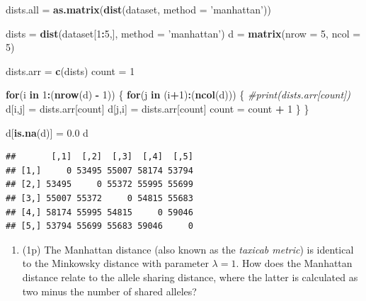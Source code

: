 \documentclass[
]{article}
\newenvironment{Shaded}{\begin{snugshade}}{\end{snugshade}}
\newcommand{\CommentTok}[1]{\textcolor[rgb]{0.56,0.35,0.01}{\textit{#1}}}
\newcommand{\ControlFlowTok}[1]{\textcolor[rgb]{0.13,0.29,0.53}{\textbf{#1}}}
\newcommand{\DataTypeTok}[1]{\textcolor[rgb]{0.13,0.29,0.53}{#1}}
\newcommand{\DecValTok}[1]{\textcolor[rgb]{0.00,0.00,0.81}{#1}}
\newcommand{\FloatTok}[1]{\textcolor[rgb]{0.00,0.00,0.81}{#1}}
\newcommand{\KeywordTok}[1]{\textcolor[rgb]{0.13,0.29,0.53}{\textbf{#1}}}
\newcommand{\NormalTok}[1]{#1}
\newcommand{\OperatorTok}[1]{\textcolor[rgb]{0.81,0.36,0.00}{\textbf{#1}}}
\newcommand{\StringTok}[1]{\textcolor[rgb]{0.31,0.60,0.02}{#1}}
\providecommand{\tightlist}{%
  \setlength{\itemsep}{0pt}\setlength{\parskip}{0pt}}
\begin{document}
\begin{Shaded}
\begin{Highlighting}[]
\NormalTok{dists.all =}\StringTok{ }\KeywordTok{as.matrix}\NormalTok{(}\KeywordTok{dist}\NormalTok{(dataset, }\DataTypeTok{method =} \StringTok{'manhattan'}\NormalTok{))}

\NormalTok{dists =}\StringTok{ }\KeywordTok{dist}\NormalTok{(dataset[}\DecValTok{1}\OperatorTok{:}\DecValTok{5}\NormalTok{,], }\DataTypeTok{method =} \StringTok{'manhattan'}\NormalTok{)}
\NormalTok{d =}\StringTok{ }\KeywordTok{matrix}\NormalTok{(}\DataTypeTok{nrow =} \DecValTok{5}\NormalTok{, }\DataTypeTok{ncol =} \DecValTok{5}\NormalTok{)}

\NormalTok{dists.arr =}\StringTok{ }\KeywordTok{c}\NormalTok{(dists)}
\NormalTok{count =}\StringTok{ }\DecValTok{1}

\ControlFlowTok{for}\NormalTok{(i }\ControlFlowTok{in} \DecValTok{1}\OperatorTok{:}\NormalTok{(}\KeywordTok{nrow}\NormalTok{(d) }\OperatorTok{-}\StringTok{ }\DecValTok{1}\NormalTok{)) \{}
  \ControlFlowTok{for}\NormalTok{(j }\ControlFlowTok{in}\NormalTok{ (i}\OperatorTok{+}\DecValTok{1}\NormalTok{)}\OperatorTok{:}\NormalTok{(}\KeywordTok{ncol}\NormalTok{(d))) \{}
    \CommentTok{#print(dists.arr[count])}
\NormalTok{    d[i,j] =}\StringTok{ }\NormalTok{dists.arr[count]}
\NormalTok{    d[j,i] =}\StringTok{ }\NormalTok{dists.arr[count]}
\NormalTok{    count =}\StringTok{ }\NormalTok{count }\OperatorTok{+}\StringTok{ }\DecValTok{1}
\NormalTok{  \}}
\NormalTok{\}}

\NormalTok{d[}\KeywordTok{is.na}\NormalTok{(d)] =}\StringTok{ }\FloatTok{0.0}
\NormalTok{d}
\end{Highlighting}
\end{Shaded}

\begin{verbatim}
##       [,1]  [,2]  [,3]  [,4]  [,5]
## [1,]     0 53495 55007 58174 53794
## [2,] 53495     0 55372 55995 55699
## [3,] 55007 55372     0 54815 55683
## [4,] 58174 55995 54815     0 59046
## [5,] 53794 55699 55683 59046     0
\end{verbatim}

\begin{enumerate}
\def\labelenumi{\arabic{enumi}.}
\setcounter{enumi}{2}
\tightlist
\item
  (1p) The Manhattan distance (also known as the \emph{taxicab metric})
  is identical to the Minkowsky distance with parameter \(\lambda = 1\).
  How does the Manhattan distance relate to the allele sharing distance,
  where the latter is calculated as two minus the number of shared
  alleles?
\end{enumerate}
\end{document}
